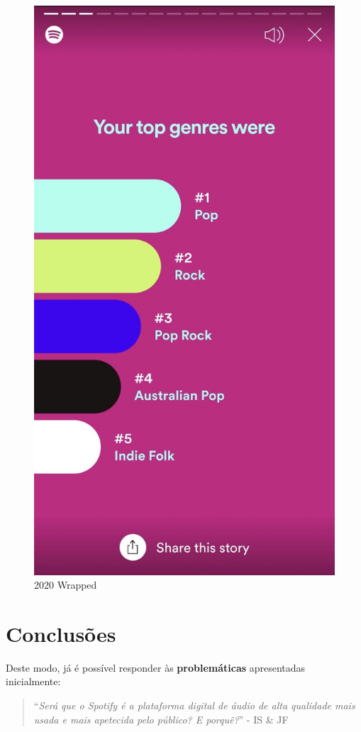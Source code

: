 \documentclass{report}
\begin{document}
\begin{figure}
\begin{minipage}[b]{0.25\textwidth}
    \includegraphics[width=\textwidth]{Imagens/generos.jpeg}
  \end{minipage}
   \hfill
  \caption{2020 Wrapped }
  \label{fig 8: 2020 Wrapped}
\end{figure}



\chapter{Conclusões}
\label{chap.conclusao}
Deste modo, já é possível responder às \textbf{problemáticas} apresentadas inicialmente: 
\begin{quote}
``\emph{Será que o Spotify é a plataforma digital de áudio de alta qualidade mais usada e mais apetecida pelo público? E porquê?}'' - IS \& JF
\end{quote}
\end{document}
